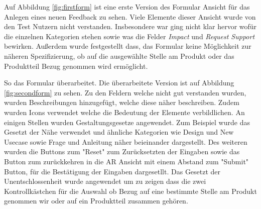 Auf Abbildung \ref{fig:firstform} ist eine erste Version des Formular Ansicht für das Anlegen eines neuen Feedback zu sehen. 
Viele Elemente dieser Ansicht wurde von den Test Nutzern nicht verstanden. Insbesondere war ging nicht klar hervor wofür die einzelnen Kategorien 
stehen sowie was die Felder \textit{Impact} und \textit{Request Support} bewirken. Außerdem wurde festgestellt dass, das Formular keine Möglichkeit 
zur näheren Spezifizierung, ob auf die ausgewählte Stelle am Produkt oder das Produktteil Bezug genommen wird ermöglicht. 

So das Formular überarbeitet. Die überarbeitete Version ist auf Abbildung \ref{fig:secondform} zu sehen. Zu den Feldern welche nicht gut verstanden wurden,
wurden Beschreibungen hinzugefügt, welche diese näher beschreiben. Zudem wurden Icons verwendet welche die Bedeutung der Elemente verbildlichen. An einigen Stellen 
wurden Gestaltungsgesetze angewendet. Zum Beispiel wurde das  Gesetzt der Nähe verwendet und ähnliche Kategorien wie Design und New Usecase sowie Frage und Anleitung näher beieinander dargestellt. 
Des weiteren wurden die Buttons zum "Reset" zum Zurücksetzten der Eingaben sowie das Button zum zurückkehren in die AR Ansicht mit einem Abstand zum "Submit" Button, für die Bestätigung der Eingaben 
dargesetllt. Das Gesetzt der Unentschlossenheit wurde angewendet um zu zeigen dass die zwei Kontrollkästchen für die Auswahl ob Bezug auf eine bestimmte Stelle am Produkt genommen wir oder auf ein 
Produktteil zusammen gehören. 

